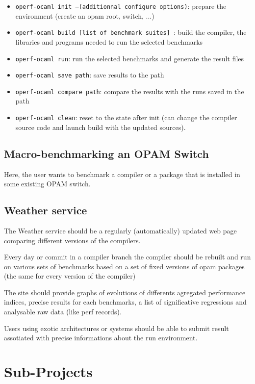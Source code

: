 \documentclass[11pt,a4paper]{article}
\begin{document}
\begin{itemize}
\item {\tt operf-ocaml init --(additionnal configure options)}: prepare the environment (create an opam root, switch, ...)
\item {\tt operf-ocaml build [list of benchmark suites] }: build the compiler, the libraries and programs needed to run the selected benchmarks
\item {\tt operf-ocaml run}: run the selected benchmarks and generate the result files
\item {\tt operf-ocaml save path}: save results to the path
\item {\tt operf-ocaml compare path}: compare the results with the runs saved in the path
\item {\tt operf-ocaml clean}: reset to the state after init (can change the compiler source code and launch build with the updated sources).
\end{itemize}

\subsection{Macro-benchmarking an OPAM Switch}

Here, the user wants to benchmark a compiler or a package that is
installed in some existing OPAM switch.

\subsection{Weather service}

The Weather service should be a regularly (automatically) updated web
page comparing different versions of the compilers.

Every day or commit in a compiler branch the compiler should be
rebuilt and run on various sets of benchmarks based on a set of fixed
versions of opam packages (the same for every version of the compiler)

The site should provide graphs of evolutions of differents agregated
performance indices, precise results for each benchmarks, a list of
significative regressions and analysable raw data (like perf records).

Users using exotic architectures or systems should be able to submit
result assotiated with precise informations about the run environment.

\section{Sub-Projects}
\end{document}
